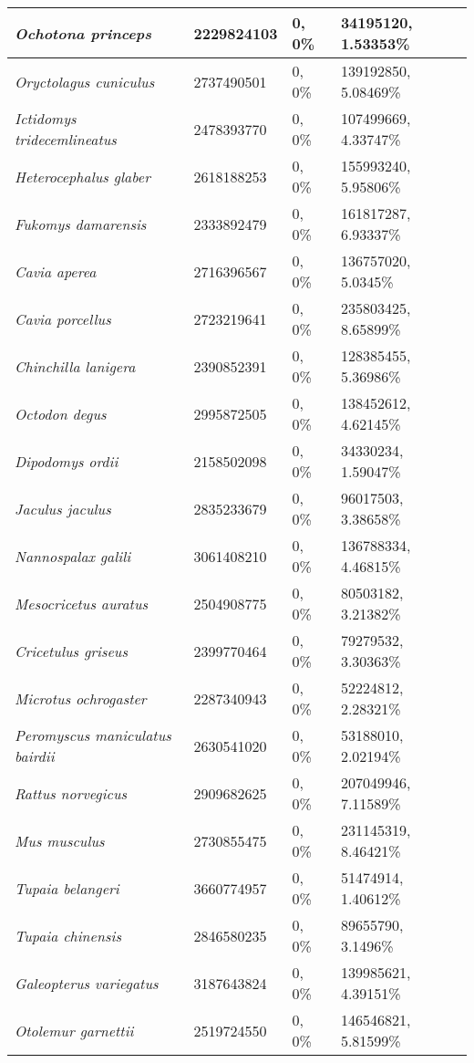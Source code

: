 {\begin{longtable}{| L{4cm} | L{2.7cm}  | L{3.7cm} | L{3.7cm} |}
\textit{Ochotona princeps} & 2229824103 & 0, 0\% & 34195120, 1.53353\% \\ \hline
\textit{Oryctolagus cuniculus} & 2737490501 & 0, 0\% & 139192850, 5.08469\% \\ \hline
\textit{Ictidomys tridecemlineatus} & 2478393770 & 0, 0\% & 107499669, 4.33747\% \\ \hline
\textit{Heterocephalus glaber} & 2618188253 & 0, 0\% & 155993240, 5.95806\% \\ \hline
\textit{Fukomys damarensis} & 2333892479 & 0, 0\% & 161817287, 6.93337\% \\ \hline
\textit{Cavia aperea} & 2716396567 & 0, 0\% & 136757020, 5.0345\% \\ \hline
\textit{Cavia porcellus} & 2723219641 & 0, 0\% & 235803425, 8.65899\% \\ \hline
\textit{Chinchilla lanigera} & 2390852391 & 0, 0\% & 128385455, 5.36986\% \\ \hline
\textit{Octodon degus} & 2995872505 & 0, 0\% & 138452612, 4.62145\% \\ \hline
\textit{Dipodomys ordii} & 2158502098 & 0, 0\% & 34330234, 1.59047\% \\ \hline
\textit{Jaculus jaculus} & 2835233679 & 0, 0\% & 96017503, 3.38658\% \\ \hline
\textit{Nannospalax galili} & 3061408210 & 0, 0\% & 136788334, 4.46815\% \\ \hline
\textit{Mesocricetus auratus} & 2504908775 & 0, 0\% & 80503182, 3.21382\% \\ \hline
\textit{Cricetulus griseus} & 2399770464 & 0, 0\% & 79279532, 3.30363\% \\ \hline
\textit{Microtus ochrogaster} & 2287340943 & 0, 0\% & 52224812, 2.28321\% \\ \hline
\textit{Peromyscus maniculatus bairdii} & 2630541020 & 0, 0\% & 53188010, 2.02194\% \\ \hline
\textit{Rattus norvegicus} & 2909682625 & 0, 0\% & 207049946, 7.11589\% \\ \hline
\textit{Mus musculus} & 2730855475 & 0, 0\% & 231145319, 8.46421\% \\ \hline
\textit{Tupaia belangeri} & 3660774957 & 0, 0\% & 51474914, 1.40612\% \\ \hline
\textit{Tupaia chinensis} & 2846580235 & 0, 0\% & 89655790, 3.1496\% \\ \hline
\textit{Galeopterus variegatus} & 3187643824 & 0, 0\% & 139985621, 4.39151\% \\ \hline
\textit{Otolemur garnettii} & 2519724550 & 0, 0\% & 146546821, 5.81599\% \\ \hline

\end{longtable}}
